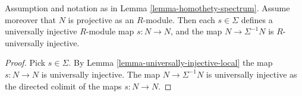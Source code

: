 \begin{lemma}
\label{lemma-invert-universally-injective}
Assumption and notation as in
Lemma \ref{lemma-homothety-spectrum}.
Assume moreover that $N$ is projective as an $R$-module.
Then each $s \in \Sigma$ defines a
universally injective $R$-module map $s : N \to N$, and the
map $N \to \Sigma^{-1}N$ is $R$-universally injective.
\end{lemma}

\begin{proof}
Pick $s \in \Sigma$. By
Lemma \ref{lemma-universally-injective-local}
the map $s : N \to N$ is universally injective.
The map $N \to \Sigma^{-1}N$ is universally injective as the directed
colimit of the maps $s : N \to N$.
\end{proof}
